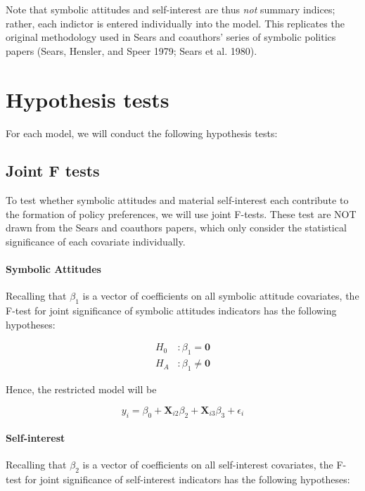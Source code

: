 \documentclass[]{article}
\let\oldparagraph\paragraph
\renewcommand{\paragraph}[1]{\oldparagraph{#1}\mbox{}}
\begin{document}
Note that symbolic attitudes and self-interest are thus \emph{not}
summary indices; rather, each indictor is entered individually into the
model. This replicates the original methodology used in Sears and
coauthors' series of symbolic politics papers (Sears, Hensler, and Speer
1979; Sears et al. 1980).

\section{Hypothesis tests}\label{hypothesis-tests}

For each model, we will conduct the following hypothesis tests:

\subsection{Joint F tests}\label{joint-f-tests}

To test whether symbolic attitudes and material self-interest each
contribute to the formation of policy preferences, we will use joint
F-tests. These test are NOT drawn from the Sears and coauthors papers,
which only consider the statistical significance of each covariate
individually.

\paragraph{Symbolic Attitudes}\label{symbolic-attitudes}

Recalling that \(\beta_1\) is a vector of coefficients on all symbolic
attitude covariates, the F-test for joint significance of symbolic
attitudes indicators has the following hypotheses:

\[\begin{aligned}
H_0 \  &: \beta_1 = \textbf{0}\\ H_A&: \beta_1 \neq \textbf{0}
\end{aligned}\]

Hence, the restricted model will be

\begin{equation}
y_i = \beta_0 + \textbf{X}_{i2}\beta_2 +  \textbf{X}_{i3}\beta_3 + \epsilon_i
\end{equation}

\paragraph{Self-interest}\label{self-interest}

Recalling that \(\beta_2\) is a vector of coefficients on all
self-interest covariates, the F-test for joint significance of
self-interest indicators has the following hypotheses:
\end{document}
